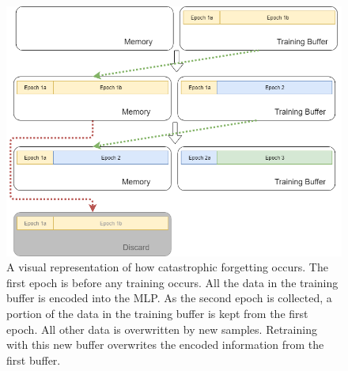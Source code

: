 	\begin{figure}[ht]
	\centering
	\centering
	\includegraphics[width=\textwidth]{figures/catastrophicForgetting_total.png}
	\caption{A visual representation of how catastrophic forgetting occurs. The first epoch is before any training occurs. All the data in the training buffer is encoded into the MLP. As the second epoch is collected, a portion of the data in the training buffer is kept from the first epoch. All other data is overwritten by new samples. Retraining with this new buffer overwrites the encoded information from the first buffer.}
	
	\end{figure}
